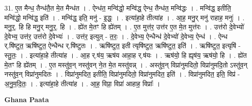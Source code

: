 \documentclass[17pt]{extarticle}
\begin{document}
31. ए॒त मैन्ध॒ तैन्ध॑तै॒त मे॒त मैन्ध॑त । . ऐन्ध॑त॒ मन्वि॑द्धो॒ मन्वि॑द्ध॒ ऐन्ध॒ तैन्ध॑त॒ मन्वि॑द्धः । . मन्वि॑द्ध॒ इतीति॒ मन्वि॑द्धो॒ मन्वि॑द्ध॒ इति॑ । . मन्वि॑द्ध॒ इति॒ मनु॑ - इ॒द्धः॒ । . इत्या॑हा॒हे तीत्या॑ह । . आ॒ह॒ मनु॒र् मनु॑ राहाह॒ मनुः॑ । . मनु॒र्॒. हि हि मनु॒र् मनु॒र्॒. हि । . ह्ये॑त मे॒तꣳ हि ह्ये॑तम् । . ए॒त मुत्त॑र॒ उत्त॑र ए॒त मे॒त मुत्त॑रः । . उत्त॑रो दे॒वेभ्यो॑ दे॒वेभ्य॒ उत्त॑र॒ उत्त॑रो दे॒वेभ्यः॑ । . उत्त॑र॒ इत्युत् - त॒रः॒ । . दे॒वेभ्य॒ ऐन्धैन्ध॑ दे॒वेभ्यो॑ दे॒वेभ्य॒ ऐन्ध॑ । . ऐन्ध र्.षि॑ष्टुत॒ ऋषि॑ष्टुत॒ ऐन्धैन्ध र्.षि॑ष्टुतः । . ऋषि॑ष्टुत॒ इती त्यृषि॑ष्टुत॒ ऋषि॑ष्टुत॒ इति॑ । . ऋषि॑ष्टुत॒ इत्यृषि॑ - स्तु॒तः॒ । . इत्या॑हा॒हे तीत्या॑ह । . आ॒ह र्.ष॑य॒ ऋष॑य आहा॒ह र्.ष॑यः । . ऋष॑यो॒ हि ह्यृष॑य॒ ऋष॑यो॒ हि । . ह्ये॑त मे॒तꣳ हि ह्ये॑तम् । . ए॒त मस्तु॑व॒न् नस्तु॑वन् ने॒त मे॒त मस्तु॑वन्न् । . अस्तु॑व॒न् विप्रा॑नुमदितो॒ विप्रा॑नुमदि॒तो ऽस्तु॑व॒न् नस्तु॑व॒न् विप्रा॑नुमदितः । . विप्रा॑नुमदित॒ इतीति॒ विप्रा॑नुमदितो॒ विप्रा॑नुमदित॒ इति॑ । . विप्रा॑नुमदित॒ इति॒ विप्र॑ - अ॒नु॒म॒दि॒तः॒ । . इत्या॑हा॒हे तीत्या॑ह । . आ॒ह॒ विप्रा॒ विप्रा॑ आहाह॒ विप्राः᳚ । \newline

\textbf{Ghana Paata } \newline
\end{document}
